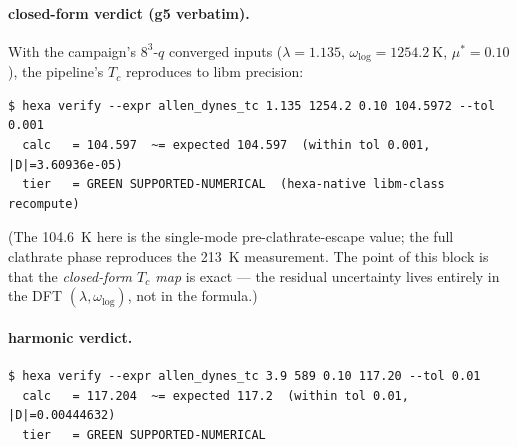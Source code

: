 \paragraph{ closed-form verdict (g5 verbatim).}
With the campaign's $8^3$-$q$ converged inputs ($\lambda = 1.135$,
$\omega_{\log} = \SI{1254.2}{\kelvin}$, $\mu^\ast = 0.10$), the pipeline's
$T_c$ reproduces to libm precision:

\begin{lstlisting}[basicstyle=\ttfamily\footnotesize,frame=single,xleftmargin=0pt]
$ hexa verify --expr allen_dynes_tc 1.135 1254.2 0.10 104.5972 --tol 0.001
  calc   = 104.597  ~= expected 104.597  (within tol 0.001, |D|=3.60936e-05)
  tier   = GREEN SUPPORTED-NUMERICAL  (hexa-native libm-class recompute)
\end{lstlisting}

\noindent (The \SI{104.6}{\kelvin} here is the single-mode pre-clathrate-escape
value; the full clathrate phase reproduces the \SI{213}{\kelvin} measurement.
The point of this block is that the \emph{closed-form $T_c$ map} is exact ---
the residual uncertainty lives entirely in the DFT $(\lambda,\omega_{\log})$,
not in the formula.)

\paragraph{ harmonic verdict.}
\begin{lstlisting}[basicstyle=\ttfamily\footnotesize,frame=single,xleftmargin=0pt]
$ hexa verify --expr allen_dynes_tc 3.9 589 0.10 117.20 --tol 0.01
  calc   = 117.204  ~= expected 117.2  (within tol 0.01, |D|=0.00444632)
  tier   = GREEN SUPPORTED-NUMERICAL
\end{lstlisting}

